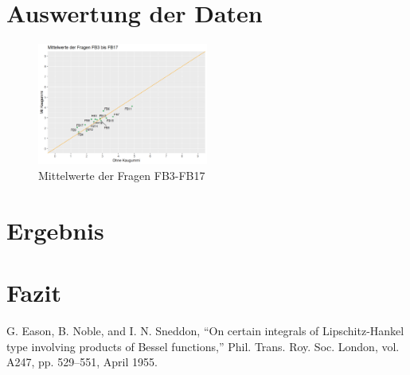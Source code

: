 \documentclass[conference]{IEEEtran}
\begin{document}
\section{Auswertung der Daten}




\begin{figure}
	\centering
	\includegraphics[width=0.5\textwidth]{Mittelwert3-17.png}
	\caption{Mittelwerte der Fragen FB3-FB17}
	\label{img:mittelwerte}
\end{figure}



\section{Ergebnis}



\section{Fazit}



\begin{thebibliography}{00}
 G. Eason, B. Noble, and I. N. Sneddon, ``On certain integrals of Lipschitz-Hankel type involving products of Bessel functions,'' Phil. Trans. Roy. Soc. London, vol. A247, pp. 529--551, April 1955.

\end{thebibliography}
\end{document}
